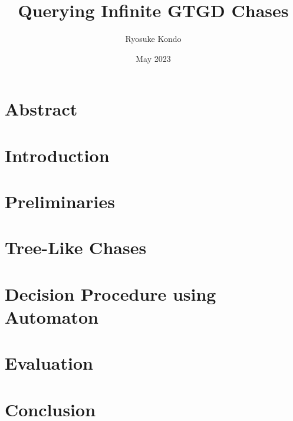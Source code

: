 \documentclass[11pt]{article}
\title{Querying Infinite GTGD Chases}
\author{Ryosuke Kondo}
\date{May 2023}
\begin{document}
\maketitle

\newpage
\tableofcontents
\newpage

\section*{Abstract}

\newpage
\section{Introduction}

\newpage
\section{Preliminaries}

\newpage
\section{Tree-Like Chases}

\newpage
\section{Decision Procedure using Automaton}

\newpage
\section{Evaluation}

\newpage
\section{Conclusion}
\end{document}
